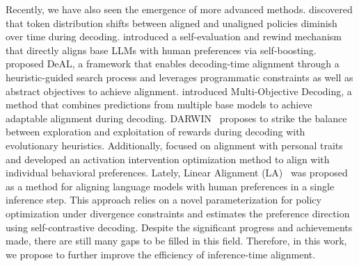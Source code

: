 Recently, we have also seen the emergence of more advanced methods. \citet{lin2023unlocking} discovered that token distribution shifts between aligned and unaligned policies diminish over time during decoding. \citet{li2023rain} introduced a self-evaluation and rewind mechanism that directly aligns base LLMs with human preferences via self-boosting. \citet{huang2024deal} proposed DeAL, a framework that enables decoding-time alignment through a heuristic-guided search process and leverages programmatic constraints as well as abstract objectives to achieve alignment. \citep{shi2024decoding} introduced Multi-Objective Decoding, a method that combines predictions from multiple base models to achieve adaptable alignment during decoding.  DARWIN~\citep{hung2024reward} proposes to strike the balance between exploration and exploitation of rewards during decoding with evolutionary heuristics. Additionally, \citet{zhu2024personality} focused on alignment with personal traits and developed an activation intervention optimization method to align with individual behavioral preferences. Lately, Linear Alignment (LA)~\citep{Gao2024LinearAA} was proposed as a method for aligning language models with human preferences in a single inference step. This approach relies on a novel parameterization for policy optimization under divergence constraints and estimates the preference direction using self-contrastive decoding.
	Despite the significant progress and achievements made, there are still many gaps to be filled in this field. Therefore, in this work, we propose \modelname{} to further
	improve the efficiency of inference-time alignment.